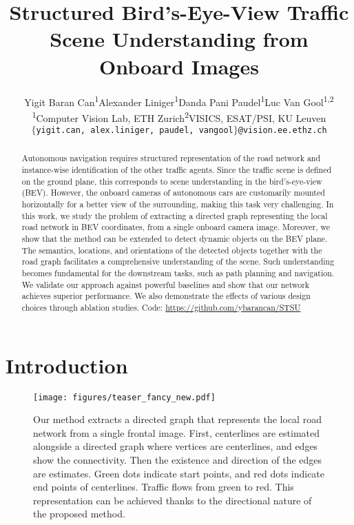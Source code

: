 \documentclass[10pt,twocolumn,letterpaper]{article}
\begin{document}
\title{Structured Bird's-Eye-View Traffic Scene Understanding from Onboard Images }
\author{ Yigit Baran Can\textsuperscript{1}\space\space\space\space Alexander Liniger\textsuperscript{1}\space\space\space\space Danda Pani Paudel\textsuperscript{1}\space\space\space\space Luc Van Gool\textsuperscript{1,2}\\
\textsuperscript{1}Computer Vision Lab, ETH Zurich\space\space\space\space \textsuperscript{2}VISICS, ESAT/PSI, KU Leuven \\ {\tt\small $\{$yigit.can, alex.liniger, paudel, vangool$\}$@vision.ee.ethz.ch} }
\maketitle
\ificcvfinal\thispagestyle{empty}\fi

\begin{abstract}
Autonomous navigation requires structured representation of the road network and instance-wise identification of the other traffic agents. Since the traffic scene is defined on the ground plane, this corresponds to scene understanding in the bird's-eye-view (BEV). However, the onboard cameras of autonomous cars are customarily mounted horizontally for a better view of the surrounding, making this task very challenging. In this work, we study the problem of extracting a directed graph representing the local road network in BEV coordinates, from a single onboard camera image. Moreover, we show that the method can be extended to detect dynamic objects on the BEV plane. The semantics, locations, and orientations of the detected objects together with the road graph facilitates a comprehensive understanding of the scene. Such understanding becomes fundamental for the downstream tasks, such as path planning and navigation. We validate our approach against powerful baselines and show that our network achieves superior performance. We also demonstrate the effects of various design choices through ablation studies. Code: \url{https://github.com/ybarancan/STSU}
\end{abstract}

\section{Introduction}

\begin{figure}
    \centering
    \texttt{[image: figures/teaser\_fancy\_new.pdf]}
\caption{Our method extracts a directed graph that represents the local road network from a single frontal image. First, centerlines are estimated alongside a directed graph where vertices are centerlines, and edges show the connectivity. Then the existence and direction of the edges are estimates. Green dots indicate start points, and red dots indicate end points of centerlines. Traffic flows from green to red. This representation can be achieved thanks to the directional nature of the proposed method.}
    \label{fig:teaser}
    \vspace{-1em}
\end{figure}
\end{document}
